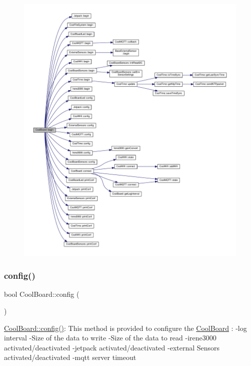 \begin{figure}[H]
\begin{center}
\leavevmode
\includegraphics[width=350pt]{classCoolBoard_acba7c5aef7268b2c0044bdb54d3b9d76_cgraph}
\end{center}
\end{figure}
\mbox{\label{classCoolBoard_a583a874c09c07e70a6eb9229fc4beddb}} 
\subsubsection{\texorpdfstring{config()}{config()}}
{\footnotesize\ttfamily bool Cool\+Board\+::config (\begin{DoxyParamCaption}{ }\end{DoxyParamCaption})}

\hyperlink{classCoolBoard_a583a874c09c07e70a6eb9229fc4beddb}{Cool\+Board\+::config()}\+: This method is provided to configure the \hyperlink{classCoolBoard}{Cool\+Board} \+: -\/log interval -\/\+Size of the data to write -\/\+Size of the data to read -\/irene3000 activated/deactivated -\/jetpack activated/deactivated -\/external Sensors activated/deactivated -\/mqtt server timeout

